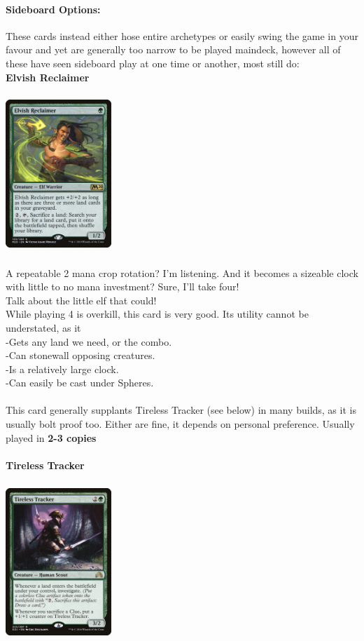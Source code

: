 \documentclass{report}
\begin{document}
\paragraph{Sideboard Options:\\}
These cards instead either hose entire archetypes or easily swing the game in your favour and yet are generally too narrow to be played maindeck, however all of these have seen sideboard play at one time or another, most still do:\\
\newpage
\textbf{Elvish Reclaimer\\}
\begin{center}
\includegraphics [width = 4cm, height = 6cm] {elvish-reclaimer}
\end{center}
A repeatable 2 mana crop rotation? I'm listening. And it becomes a sizeable clock with little to no mana investment? Sure, I'll take four!\\
Talk about the little elf that could!\\
While playing 4 is overkill, this card is very good. Its utility cannot be understated, as it\\
	-Gets any land we need, or the combo.\\
	-Can stonewall opposing creatures.\\
	-Is a relatively large clock.\\
	-Can easily be cast under Spheres.\\\\
This card generally supplants Tireless Tracker (see below) in many builds, as it is usually bolt proof too. Either are fine, it depends on personal preference. Usually played in \textbf{2-3 copies}\\\\
\newpage
\textbf{Tireless Tracker\\}
\begin{center}
\includegraphics [width = 4cm, height = 6cm] {tireless-tracker}
\end{center}
\end{document}
